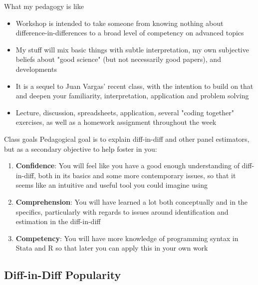 \documentclass{beamer}
\begin{document}
\begin{frame}{What my pedagogy is like}

\begin{itemize}
\item Workshop is intended to take someone from knowing nothing about difference-in-differences to a broad level of competency on advanced topics
\item My stuff will mix basic things with subtle interpretation, my own subjective beliefs about "good science" (but not necessarily good papers), and developments
\item It is a sequel to Juan Vargas' recent class, with the intention to build on that and deepen your familiarity, interpretation, application and problem solving
\item Lecture, discussion, spreadsheets, application, several "coding together" exercises, as well as a homework assignment throughout the week
\end{itemize}

\end{frame}


\begin{frame}{Class goals}
Pedagogical goal is to explain diff-in-diff and other panel estimators, but as a secondary objective to help foster in you:

  \begin{enumerate}
    \item \textbf{Confidence}: You will feel like you have a good enough understanding of diff-in-diff, both in its basics and some more contemporary issues, so that it seems like an intuitive and useful tool you could imagine using
    \item \textbf{Comprehension}: You will have learned a lot both conceptually and in the specifics, particularly with regards to issues around identification and estimation in the diff-in-diff
    \item \textbf{Competency}: You will have more knowledge of programming syntax in Stata and R so that later you can apply this in your own work
  \end{enumerate}

\end{frame}







\subsection{Diff-in-Diff Popularity}
\end{document}
